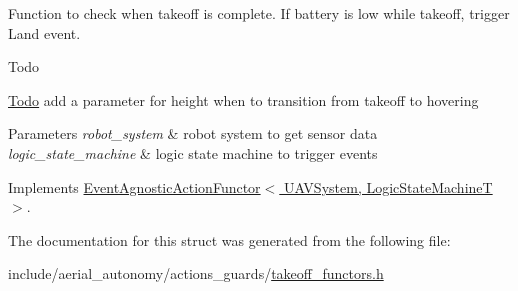 Function to check when takeoff is complete. If battery is low while takeoff, trigger Land event. 

\begin{DoxyRefDesc}{Todo}
\item[\hyperlink{todo__todo000010}{Todo}]add a parameter for height when to transition from takeoff to hovering\end{DoxyRefDesc}



\begin{DoxyParams}{Parameters}
{\em robot\-\_\-system} & robot system to get sensor data \\
\hline
{\em logic\-\_\-state\-\_\-machine} & logic state machine to trigger events \\
\hline
\end{DoxyParams}


Implements \hyperlink{structEventAgnosticActionFunctor_a53a48938d68370ff2ef262222565ffcf}{Event\-Agnostic\-Action\-Functor$<$ U\-A\-V\-System, Logic\-State\-Machine\-T $>$}.



The documentation for this struct was generated from the following file\-:\begin{DoxyCompactItemize}
\item 
include/aerial\-\_\-autonomy/actions\-\_\-guards/\hyperlink{takeoff__functors_8h}{takeoff\-\_\-functors.\-h}\end{DoxyCompactItemize}

